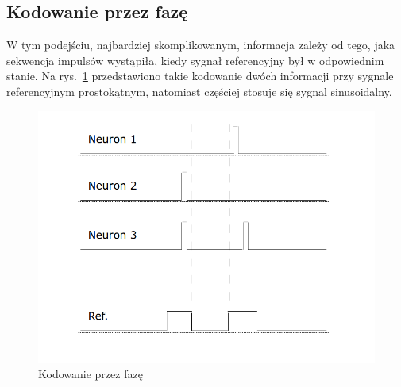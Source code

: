 \subsection{Kodowanie przez fazę}
W tym podejściu, najbardziej skomplikowanym, informacja zależy od tego, jaka sekwencja impulsów wystąpiła, 
kiedy sygnał referencyjny był w odpowiednim stanie. 
Na rys.~\ref{fig:Phase} przedstawiono takie kodowanie dwóch informacji przy sygnale referencyjnym prostokątnym, 
natomiast częściej stosuje się sygnal sinusoidalny.
	\begin{figure}[ht]
		\centering
		\includegraphics[width=\textwidth/2]{../Phase.png}
		\caption{Kodowanie przez fazę}
                \label{fig:Phase}
	\end{figure}

